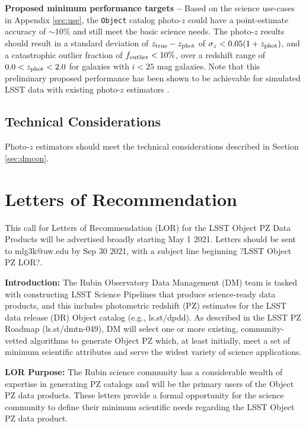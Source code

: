 \documentclass[DM,authoryear,toc]{lsstdoc}
\begin{document}
\textbf{Proposed minimum performance targets --} 
Based on the science use-cases in Appendix \ref{sec:use}, the {\tt Object} catalog photo-$z$ could have a point-estimate accuracy of $\sim10\%$ and still meet the basic science needs.
The photo-$z$ results should result in a standard deviation of $z_{\rm true}-z_{\rm phot}$ of $\sigma_z < 0.05(1+z_{\rm phot})$, and a catastrophic outlier fraction of $f_{\rm outlier} < 10\%$, over a redshift range of $0.0 < z_{\rm phot} < 2.0$ for galaxies with $i<25$ mag galaxies.
Note that this preliminary proposed performance has been shown to be achievable for simulated LSST data with existing photo-$z$ estimators \citep[e.g.,][]{2018AJ....155....1G,2020MNRAS.499.1587S}.

\subsection{Technical Considerations}

Photo-$z$ estimators should meet the technical considerations described in Section \ref{sec:dmcon}.



\section{Letters of Recommendation} \label{sec:lor}

This call for Letters of Recommendation (LOR) for the LSST Object PZ Data Products will be advertised broadly starting May 1 2021.
Letters should be sent to mlg3k@uw.edu by Sep 30 2021, with a subject line beginning ?LSST Object PZ LOR?.

\textbf{Introduction:} 
The Rubin Observatory Data Management (DM) team is tasked with constructing LSST Science Pipelines that produce science-ready data products, and this includes photometric redshift (PZ) estimates for the LSST data release (DR) Object catalog (e.g., ls.st/dpdd).
As described in the LSST PZ Roadmap (ls.st/dmtn-049), DM will select one or more existing, community-vetted algorithms to generate Object PZ which, at least initially, meet a set of minimum scientific attributes and serve the widest variety of science applications.

\textbf{LOR Purpose:}
The Rubin science community has a considerable wealth of expertise in generating PZ catalogs and will be the primary users of the Object PZ data products.
These letters provide a formal opportunity for the science community to define their minimum scientific needs regarding the LSST Object PZ data product. 
\end{document}
